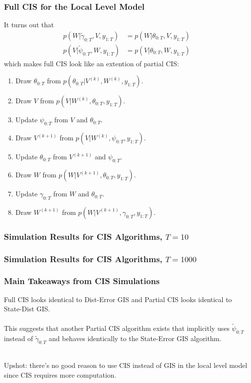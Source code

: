 \documentclass[xcolor=dvipsnames]{beamer}
\begin{document}
\begin{frame}
    \frametitle{Full CIS for the Local Level Model}
It turns out that
\begin{align*}
  p(W|\tilde{\gamma}_{0:T}, V, y_{1:T}) &= p(W|\theta_{0:T}, V, y_{1:T})\\
  p(V|\tilde{\psi}_{0:T}, W, y_{1:T}) &= p(V|\theta_{0:T}, W, y_{1:T})
\end{align*}
\pause 
which makes full CIS look like an extention of partial CIS:
\begin{enumerate}
  \item Draw $\theta_{0:T}$ from $p(\theta_{0:T}|V^{(k)},W^{(k)},y_{1:T})$.
  \item Draw $V$ from $p(V|W^{(k)}, \theta_{0:T}, y_{1:T})$.
  \item Update $\psi_{0:T}$ from $V$ and $\theta_{0:T}$.
  \item Draw $V^{(k+1)}$ from $p(V|W^{(k)}, \psi_{0:T}, y_{1:T})$.
  \item Update $\theta_{0:T}$ from $V^{(k+1)}$ and $\psi_{0:T}$.
  \item Draw $W$ from $p(W|V^{(k+1)}, \theta_{0:T}, y_{1:T})$.
  \item Update $\gamma_{0:T}$ from $W$ and $\theta_{0:T}$.
  \item Draw $W^{(k+1)}$ from $p(W|V^{(k+1)}, \gamma_{0:T}, y_{1:T})$.
\end{enumerate}
\end{frame}


\begin{frame}
\frametitle{Simulation Results for CIS Algorithms, $T=10$}

\end{frame}

\begin{frame}
\frametitle{Simulation Results for CIS Algorithms, $T=1000$}

\end{frame}
 
\begin{frame}
   \frametitle{Main Takeaways from CIS Simulations}
   Full CIS looks identical to Dist-Error GIS and Partial CIS looks identical to State-Dist GIS.\\~\\
   
   This suggests that another Partial CIS algorithm exists that implicitly uses $\tilde{\psi}_{0:T}$ instead of $\tilde{\gamma}_{0:T}$ and behaves identically to the State-Error GIS algorithm.\\~\\
   \pause
   
   Upshot: there's no good reason to use CIS instead of GIS in the local level model since CIS requires more computation.\\~\\
\end{frame}
\end{document}
